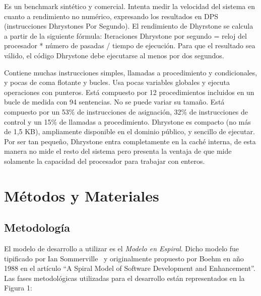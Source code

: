 \documentclass[conference]{IEEEtran}
\begin{document}
 		Es un benchmark sintético y comercial. Intenta medir la velocidad del sistema en cuanto a rendimiento no numérico, expresando los
		resultados en DPS (instrucciones Dhrystones Por Segundo). El rendimiento de Dhyrstone se calcula a partir de la siguiente fórmula: Iteraciones
		Dhrystone por segundo = reloj del procesador * número de pasadas / tiempo de ejecución. Para que el resultado sea válido, el código Dhrystone debe
		ejecutarse al menos por dos segundos. %
		
		Contiene muchas instrucciones simples, llamadas a procedimiento y condicionales, y pocas de coma flotante y bucles. Usa pocas variables globales y
		ejecuta operaciones con punteros. Está compuesto por 12 procedimientos incluidos en un bucle de medida con 94 sentencias. No se puede variar su
		tamaño. Está compuesto por un 53\% de instrucciones de asignación, 32\% de instrucciones de control y un 15\% de llamadas a procedimiento.
		Dhrystone es compacto (no más de 1,5 KB), ampliamente disponible en el dominio público, y sencillo de ejecutar. Por ser tan pequeño, Dhrystone
		entra completamente en la caché interna, de esta manera no mide el resto del sistema pero presenta la ventaja de que mide solamente la capacidad
		del procesador para trabajar con enteros.
\section{Métodos y Materiales} \label{sec:background}

\subsection{Metodología}

El modelo de desarrollo a utilizar es el \textit{Modelo en Espiral}. Dicho modelo fue tipificado por Ian Sommerville~\cite{Etiqueta00} y originalmente propuesto por Boehm en
año 1988 en el artículo ``A Spiral Model of Software Development and Enhancement''.
Las fases metodológicas utilizadas para el desarrollo están representados en la Figura 1: 
\end{document}
